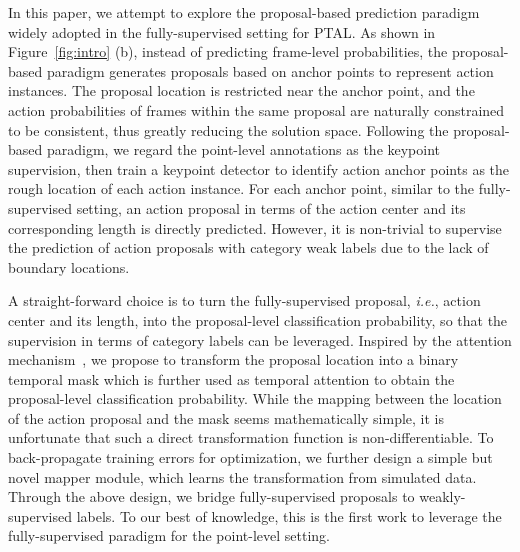 \documentclass[final]{cvpr}
\begin{document}
In this paper, we attempt to explore the proposal-based prediction paradigm~\cite{shou2016temporal,shou2017cdc,gao2017turn,yang2020revisiting} widely adopted in the fully-supervised setting for PTAL. As shown in Figure~\ref{fig:intro} (b), instead of predicting frame-level probabilities, the proposal-based paradigm generates proposals based on anchor points to represent action instances. The proposal location is restricted near the anchor point, and the action probabilities of frames within the same proposal are naturally constrained to be consistent, thus greatly reducing the solution space. Following the proposal-based paradigm, we regard the point-level annotations as the keypoint supervision, then train a keypoint detector to identify action anchor points as the rough location of each action instance. For each anchor point, similar to the fully-supervised setting, an action proposal in terms of the action center and its corresponding length is directly predicted. However, it is non-trivial to supervise the prediction of action proposals with category weak labels due to the lack of boundary locations.


A straight-forward choice is to turn the fully-supervised proposal, \emph{i.e.}, action center and its length, into the proposal-level classification probability, so that the supervision in terms of category labels can be leveraged. Inspired by the attention mechanism~\cite{vaswani2017attention}, we propose to transform the proposal location into a binary temporal mask which is further used as temporal attention to obtain the proposal-level classification probability. While the mapping between the location of the action proposal and the mask seems mathematically simple, it is unfortunate that such a direct transformation function is non-differentiable. To back-propagate training errors for optimization, we further design a simple but novel mapper module, which learns the transformation from simulated data. Through the above design, we bridge fully-supervised proposals to weakly-supervised labels. To our best of knowledge, this is the first work to leverage the fully-supervised paradigm for the point-level setting.
\end{document}
